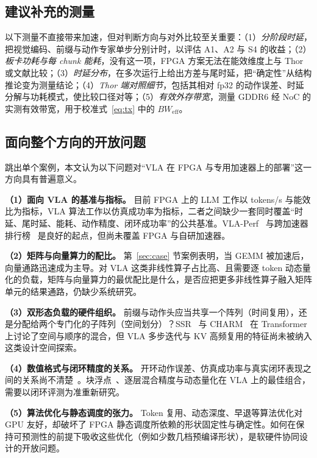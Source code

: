 \documentclass[a4paper,10.5pt]{ctexart}
\begin{document}
\subsection{建议补充的测量}

以下测量不直接带来加速，但对判断方向与对外比较至关重要：（1）\emph{分阶段时延}，把视觉编码、前缀与动作专家单步分别计时，以评估 A1、A2 与 S4 的收益；（2）\emph{板卡功耗与每 chunk 能耗}，没有这一项，FPGA 方案无法在能效维度上与 Thor 或文献比较；（3）\emph{时延分布}，在多次运行上给出方差与尾时延，把“确定性”从结构推论变为测量结论；（4）\emph{Thor 端对照细节}，包括其相对 fp32 的动作误差、时延分解与功耗模式，使比较口径对等；（5）\emph{有效外存带宽}，测量 GDDR6 经 NoC 的实测有效带宽，用于校准式~\eqref{eq:tx} 中的 $BW_{\text{eff}}$。

\subsection{面向整个方向的开放问题}

跳出单个案例，本文认为以下问题对“VLA 在 FPGA 与专用加速器上的部署”这一方向具有普遍意义。

\textbf{（1）面向 VLA 的基准与指标。} 目前 FPGA 上的 LLM 工作以 tokens/s 与能效比为指标，VLA 算法工作以仿真成功率为指标，二者之间缺少一套同时覆盖“时延、尾时延、能耗、动作精度、闭环成功率”的公共基准。VLA-Perf~\cite{vlaperf} 与跨加速器排行榜~\cite{xpuvla} 是良好的起点，但尚未覆盖 FPGA 与自研加速器。

\textbf{（2）矩阵与向量算力的配比。} 第~\ref{sec:case} 节案例表明，当 GEMM 被加速后，向量通路迅速成为主导。对 VLA 这类非线性算子占比高、且需要逐 token 动态量化的负载，矩阵与向量算力的最优配比是什么，是否应把更多非线性算子融入矩阵单元的结果通路，仍缺少系统研究。

\textbf{（3）双形态负载的硬件组织。} 前缀与动作头应当共享一个阵列（时间复用），还是分配给两个专门化的子阵列（空间划分）？SSR~\cite{ssr} 与 CHARM~\cite{charm} 在 Transformer 上讨论了空间与顺序的混合，但 VLA 多步迭代与 KV 高频复用的特征尚未被纳入这类设计空间探索。

\textbf{（4）数值格式与闭环精度的关系。} 开环动作误差、仿真成功率与真实闭环表现之间的关系尚不清楚~\cite{vlaquantbench}。块浮点~\cite{msfp,mx}、逐层混合精度与动态量化在 VLA 上的最佳组合，需要以闭环评测为准重新研究。

\textbf{（5）算法优化与静态调度的张力。} Token 复用、动态深度、早退等算法优化对 GPU 友好，却破坏了 FPGA 静态调度所依赖的形状固定性与确定性。如何在保持可预测性的前提下吸收这些优化（例如少数几档预编译形状），是软硬件协同设计的开放问题。
\end{document}
